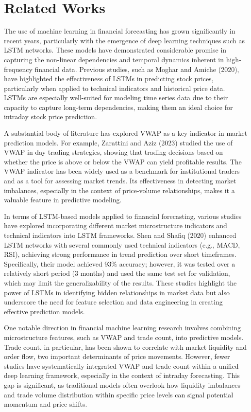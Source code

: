 \documentclass[letterpaper]{article}
\begin{document}
\section{Related Works}

The use of machine learning in financial forecasting has grown significantly in recent years, particularly with the emergence of deep learning techniques such as LSTM networks. These models have demonstrated considerable promise in capturing the non-linear dependencies and temporal dynamics inherent in high-frequency financial data. Previous studies, such as Moghar and Amiche (2020)\cite{moghar2020stock}, have highlighted the effectiveness of LSTMs in predicting stock prices, particularly when applied to technical indicators and historical price data. LSTMs are especially well-suited for modeling time series data due to their capacity to capture long-term dependencies, making them an ideal choice for intraday stock price prediction.

A substantial body of literature has explored VWAP as a key indicator in market prediction models. For example, Zarattini and Aziz (2023)\cite{zarattini2023vwap} studied the use of VWAP in day trading strategies, showing that trading decisions based on whether the price is above or below the VWAP can yield profitable results. The VWAP indicator has been widely used as a benchmark for institutional traders and as a tool for assessing market trends. Its effectiveness in detecting market imbalances, especially in the context of price-volume relationships, makes it a valuable feature in predictive modeling.

In terms of LSTM-based models applied to financial forecasting, various studies have explored incorporating different market microstructure indicators and technical indicators into LSTM frameworks. Shen and Shafiq (2020)\cite{shen2020shortterm} enhanced LSTM networks with several commonly used technical indicators (e.g., MACD, RSI), achieving strong performance in trend prediction over short timeframes. Specifically, their model achieved 93\% accuracy; however, it was tested over a relatively short period (3 months) and used the same test set for validation, which may limit the generalizability of the results. These studies highlight the power of LSTMs in identifying hidden relationships in market data but also underscore the need for feature selection and data engineering in creating effective prediction models.

One notable direction in financial machine learning research involves combining microstructure features, such as VWAP and trade count, into predictive models. Trade count, in particular, has been shown to correlate with market liquidity and order flow, two important determinants of price movements. However, fewer studies have systematically integrated VWAP and trade count within a unified deep learning framework, especially in the context of intraday forecasting. This gap is significant, as traditional models often overlook how liquidity imbalances and trade volume distribution within specific price levels can signal potential momentum and price shifts.
\end{document}
